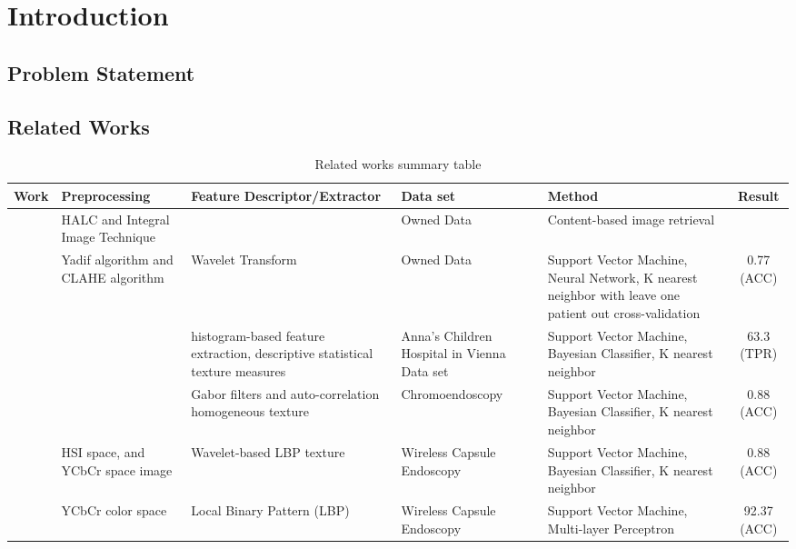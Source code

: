 \documentclass{article}
\begin{document}
	\section{Introduction}
	\subsection{Problem Statement}
	
	\subsection{Related Works}
	\begin{table}
		\centering
		\begin{tabular}{ c  p{3cm}  p{3cm}  p{2.5cm}  p{3.5cm}  c }
			\toprule
			\textbf{Work} & \textbf{Preprocessing} & \textbf{Feature Descriptor/Extractor} & \textbf{Data set} & \textbf{Method} & \textbf{Result}\\
			\midrule
			\cite{7348442} & HALC \cite{halc} and Integral Image Technique  & & Owned Data& Content-based image retrieval & \\
			\midrule
			\cite{0779} & Yadif algorithm \cite{yadif} and CLAHE algorithm \cite{CLAHE} & Wavelet Transform & Owned Data & Support Vector Machine, Neural Network, K nearest neighbor with leave one patient out cross-validation & 0.77 (ACC)\\
			\midrule
			\cite{20080465} &  & histogram-based feature extraction, descriptive statistical texture measures & Anna’s Children Hospital
			in Vienna Data set & Support Vector Machine, Bayesian Classifier, K nearest neighbor & 63.3 (TPR)\\
			\midrule
			\cite{2212440} &  & Gabor filters and auto-correlation homogeneous	texture & Chromoendoscopy & Support Vector Machine, Bayesian Classifier, K nearest neighbor & 0.88 (ACC)\\
			\midrule
			\cite{5649638} & HSI space, and YCbCr space image & Wavelet-based LBP texture & Wireless Capsule Endoscopy & Support Vector Machine, Bayesian Classifier, K nearest neighbor & 0.88 (ACC)\\
			\midrule
			\cite{1336–1342} & YCbCr color space & Local Binary Pattern (LBP) & Wireless Capsule Endoscopy & Support Vector Machine, Multi-layer Perceptron & 92.37 (ACC)\\
			\bottomrule
		\end{tabular}
	\caption{Related works summary table}
	\label{tab:relatedwork}
	\end{table}
\end{document}
